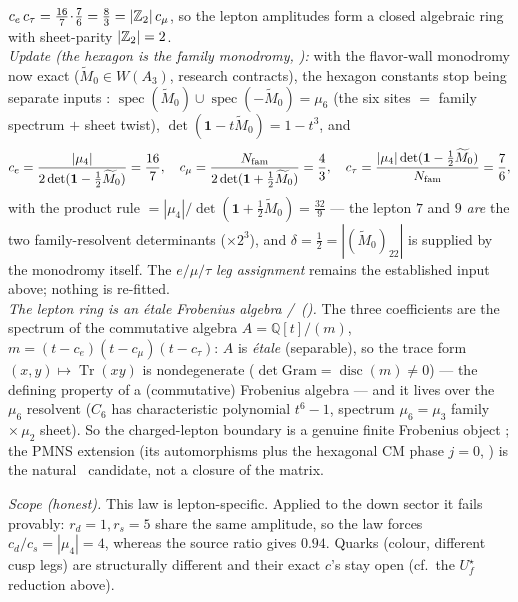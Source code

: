 \begin{keybox}[Where the lepton rationals come from: $\delta=\tfrac12$ resolvent $+$ product rule \mE]
$c_e\,c_\tau=\tfrac{16}7\!\cdot\!\tfrac76=\tfrac83=|\mathbb{Z}_2|\,c_\mu$, so the lepton amplitudes form a closed
algebraic ring with sheet-parity $|\mathbb{Z}_2|=2$. \,\allowbreak{}\,\allowbreak{}
\smallskip\\
\noindent\emph{Update (the hexagon is the family monodromy, ):}
with the flavor-wall monodromy now exact ($\widetilde M_0\in W(A_3)$, research contracts), the hexagon
constants stop being separate inputs \mE: $\operatorname{spec}(\widetilde M_0)\cup\operatorname{spec}(-\widetilde M_0)=\mu_6$
(the six sites $=$ family spectrum $+$ sheet twist), $\det(\mathbf1-t\widetilde M_0)=1-t^3$, and
\[
  c_e=\frac{|\mu_4|}{2\det(\mathbf1-\tfrac12\widetilde M_0)}=\frac{16}{7},\quad
  c_\mu=\frac{N_{\mathrm{fam}}}{2\det(\mathbf1+\tfrac12\widetilde M_0)}=\frac{4}{3},\quad
  c_\tau=\frac{|\mu_4|\det(\mathbf1-\tfrac12\widetilde M_0)}{N_{\mathrm{fam}}}=\frac{7}{6},
\]
with the product rule $=|\mu_4|/\det(\mathbf1+\tfrac12\widetilde M_0)=\tfrac{32}9$ --- the lepton $7$
and $9$ \emph{are} the two family-resolvent determinants ($\times2^3$), and $\delta=\tfrac12=
|(\widetilde M_0)_{22}|$ is supplied by the monodromy itself. The $e/\mu/\tau$ \emph{leg assignment}
remains the established input above; nothing is re-fitted.
\smallskip\\
\noindent\emph{The lepton ring is an \'etale Frobenius algebra \mE/\mC\ ().}
The three coefficients are the spectrum of the commutative algebra $A=\mathbb Q[t]/(m)$,
$m=(t{-}c_e)(t{-}c_\mu)(t{-}c_\tau)$: $A$ is \emph{\'etale} (separable), so the trace form
$(x,y)\mapsto\operatorname{Tr}(xy)$ is nondegenerate ($\det\mathrm{Gram}=\operatorname{disc}(m)\neq0$) --- the
defining property of a (commutative) Frobenius algebra --- and it lives over the $\mu_6$ resolvent
($C_6$ has characteristic polynomial $t^6{-}1$, spectrum $\mu_6=\mu_3$ family $\times\,\mu_2$ sheet). So the
charged-lepton boundary is a genuine finite Frobenius object \mE; the PMNS extension (its automorphisms plus
the hexagonal CM phase $j{=}0$, ) is the natural \mC\ candidate, not a
closure of the matrix.

\smallskip
\noindent\emph{Scope (honest).} This law is lepton-specific. Applied to the down sector it fails provably:
$r_d{=}1,r_s{=}5$ share the same amplitude, so the law forces $c_d/c_s{=}|\mu_4|{=}4$, whereas the source
ratio gives $0.94$. Quarks (colour, different cusp legs) are structurally different and their exact $c$'s
stay open (cf.\ the $U_f^\star$ reduction above).
\end{keybox}

